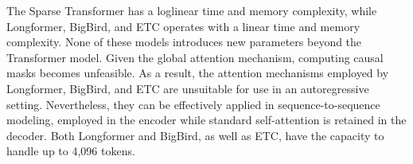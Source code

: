 The Sparse Transformer has a loglinear time and memory complexity, while Longformer, BigBird, and \ac{ETC} operates with a linear time and memory complexity. None of these models introduces new parameters beyond the Transformer model. Given the global attention mechanism, computing causal masks becomes unfeasible. As a result, the attention mechanisms employed by Longformer, BigBird, and \ac{ETC} are unsuitable for use in an autoregressive setting. Nevertheless, they can be effectively applied in sequence-to-sequence modeling, employed in the encoder while standard self-attention is retained in the decoder. Both Longformer and BigBird, as well as \ac{ETC}, have the capacity to handle up to 4,096 tokens.





